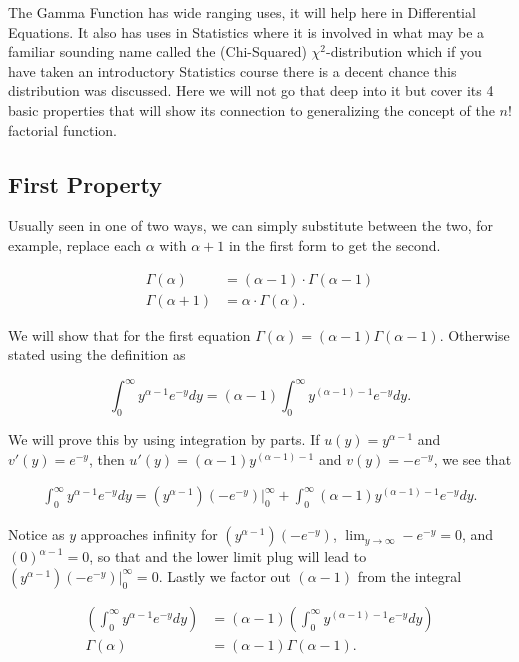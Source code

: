 \documentclass[12pt]{article}
\begin{document}
The Gamma Function has wide ranging uses, it will help here in Differential Equations. It also has uses in Statistics where it is involved in what may be a familiar sounding name called the (Chi-Squared) $\chi^2$-distribution which if you have taken an introductory Statistics course there is a decent chance this distribution was discussed. Here we will not go that deep into it but cover its 4 basic properties that will show its connection to generalizing the concept of the $n!$ factorial function.

\subsection{First Property}

Usually seen in one of two ways, we can simply substitute between the two, for example, replace each $\alpha$ with $\alpha+1$ in the first form to get the second.

\begin{align*}
    \Gamma(\alpha) &= (\alpha -1) \cdot \Gamma(\alpha -1) \\
    \Gamma(\alpha+1) &= \alpha \cdot \Gamma(\alpha).
\end{align*}

We will show that for the first equation $\Gamma(\alpha) = (\alpha -1) \Gamma(\alpha -1)$. Otherwise stated using the definition as

\begin{equation*}
\int_{0}^{\infty}y^{\alpha-1}e^{-y}dy=(\alpha-1)\int_{0}^{\infty}y^{(\alpha-1)-1}e^{-y}dy.
\end{equation*}

We will prove this by using integration by parts. If $u(y) = y^{\alpha -1}$ and $v'(y)=e^{-y}$, then $u'(y)=(\alpha -1)y^{(\alpha-1)-1}$ and $v(y)=-e^{-y}$, we see that

\begin{align*}
\int_{0}^{\infty}y^{\alpha - 1}e^{-y}dy=\left(y^{\alpha -1}\right)\left(-e^{-y}\right)\bigg|_{0}^{\infty}+\int_{0}^{\infty} (\alpha -1)y^{(\alpha - 1)-1} e^{-y} dy.
\end{align*}

Notice as $y$ approaches infinity for $\left(y^{\alpha -1}\right)\left(-e^{-y}\right)$, $\lim _{y\rightarrow \infty}-e^{-y}=0$, and $(0)^{\alpha-1}=0$, so that and the lower limit plug will lead to
$\left(y^{\alpha-1}\right)\left(-e^{-y}\right)|_{0}^{\infty}=0$. Lastly we factor out $(\alpha-1)$ from the integral

\begin{align*}
\left(\int_{0}^{\infty} y^{\alpha - 1} e^{-y} dy \right) &= (\alpha -1) \left( \int_{0}^{\infty} y^{(\alpha - 1)-1} e^{-y} dy \right) \\
\Gamma(\alpha)&=(\alpha -1) \Gamma(\alpha -1).
\end{align*}
\end{document}
